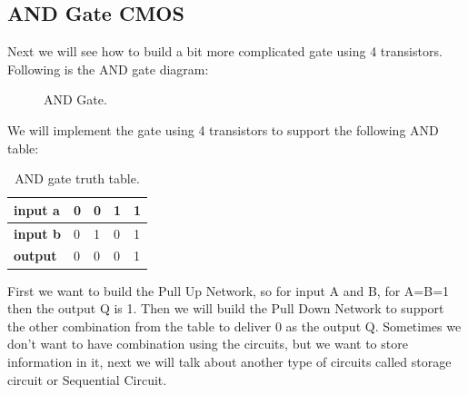 \subsection{ AND Gate CMOS}
Next we will see how to build a bit more complicated gate using 4 transistors. Following is the AND gate diagram:
\begin{figure}[h]
    \centering
    
    \caption{AND Gate.} \label{fig:and}
\end{figure}

We will implement the gate using 4 transistors to support the following AND table:
\begin{table}[h]
    \centering
    \begin{tabular}{|l|l|l|l|l|}
        \hline
        \textbf{input a} & 0 & 0 & 1 & 1 \\ \hline
        \textbf{input b} & 0 & 1 & 0 & 1 \\ \hline
        \textbf{output}  & 0 & 0 & 0 & 1 \\ \hline
    \end{tabular}
    \caption{AND gate truth table.}
\end{table}

First we want to build the Pull Up Network, so for input A and B, for A=B=1 then the output Q is 1.
Then we will build the Pull Down Network to support the other combination from the table to deliver 0 as the output Q.
Sometimes we don’t want to have combination using the circuits, but we want to store information in it, next we will talk about another type of circuits called storage circuit or Sequential Circuit.
